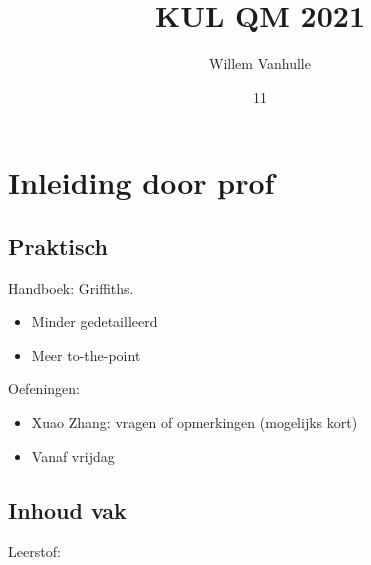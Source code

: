 \documentclass[dutch,course]{lecture}
\title{KUL QM 2021}
\author{Willem Vanhulle}
\date{11}{02}{2021}
\begin{document}
\maketitle


\section*{Inleiding door prof}

\subsection*{Praktisch}
Handboek: Griffiths.

\begin{itemize}

\item
  Minder gedetailleerd
\item
  Meer to-the-point
\end{itemize}

Oefeningen:

\begin{itemize}

\item
  Xuao Zhang: vragen of opmerkingen (mogelijks kort)
\item
  Vanaf vrijdag
\end{itemize}

\subsection*{Inhoud vak}

Leerstof:
\end{document}

